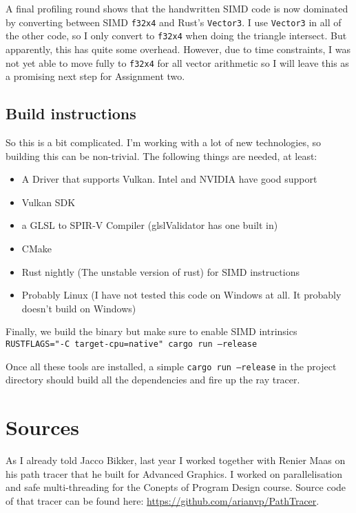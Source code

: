 \documentclass{article}
\begin{document}
A final profiling round shows that the handwritten SIMD code is now dominated
by converting between SIMD \texttt{f32x4} and Rust's \texttt{Vector3}.  I use
\texttt{Vector3} in all of the other code, so I only convert to \texttt{f32x4}
when doing the triangle intersect. But apparently, this has quite some
overhead.  However, due to time constraints, I was not yet able to move fully
to \texttt{f32x4} for all vector arithmetic so I will leave this as a promising
next step for Assignment two.




\subsection{Build instructions}
So this is a bit complicated. I'm working with a lot of new technologies, so building this can be non-trivial.
The following things are needed, at least:
\begin{itemize}
    \item A Driver that supports Vulkan.  Intel and NVIDIA have good support
    \item Vulkan SDK
    \item a GLSL to SPIR-V Compiler (glslValidator has one built in)
    \item CMake
    \item Rust nightly (The unstable version of rust) for SIMD instructions
    \item Probably Linux (I have not tested this code on Windows at all. It probably doesn't build on Windows)
\end{itemize}

Finally, we build the binary but make sure to enable SIMD intrinsics \texttt{
  RUSTFLAGS="-C target-cpu=native" cargo run --release}

Once all these tools are installed,  a simple \texttt{cargo run --release} in the project directory should build
all the dependencies and fire up the ray tracer.


\section{Sources}
As I already told Jacco Bikker, last year I worked together with Renier Maas on
his path tracer that he built for Advanced Graphics. I worked  on
parallelisation and safe multi-threading for the Conepts of Program Design
course.  Source code of that tracer can be found here:
\url{https://github.com/arianvp/PathTracer}.
\end{document}
